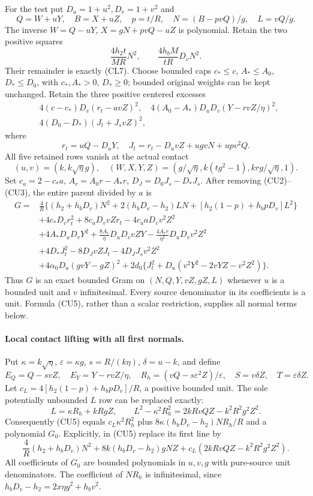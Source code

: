 For the test put $D_u=1+u^2,D_v=1+v^2$ and
\[
 Q=W+uY,\quad B=X+uZ,\quad p=t/R,
 \quad N=(B-pvQ)/g,\quad L=vQ/g.
\]
The inverse $W=Q-uY$, $X=gN+pvQ-uZ$ is polynomial.
Retain the two positive squares
\[
 \frac{4h_2t}{MR}N^2,\qquad
 \frac{4h_bM}{tR}D_vN^2.                            \tag{CU2}
\]
Their remainder is exactly (CL7). Choose bounded caps
$c_*\le c$, $A_*\le A_0$, $D_*\le D_0$, with $c_*,A_*>0$,
$D_*\ge0$; bounded original weights can be kept unchanged.
Retain the three positive centered excesses
\[
\begin{aligned}
 &4(c-c_*)D_v(r_t-avZ)^2,\quad
 4(A_0-A_*)D_uD_v(Y-rvZ/\eta)^2,\\
 &4(D_0-D_*)(J_t+J_svZ)^2,
\end{aligned}                                                     \tag{CU3}
\]
where
\[
 r_t=uQ-D_uY,\quad J_t=r_t-D_uvZ+ugvN+upv^2Q.
\]
All five retained rows vanish at the actual contact
\[
 (u,v)=(k,k\sqrt\eta g),\quad
 (W,X,Y,Z)=(g/\sqrt\eta,k(tg^2-1),krg/\sqrt\eta,1).
                                                               \tag{CU4}
\]
Set $c_a=2-c_*a$, $A_r=A_0r-A_*r$, $D_J=D_0J_s-D_*J_s$.
After removing (CU2)--(CU3), the entire parent divided by $a$ is
\begin{align*}
G={}&\frac4R\{(h_2+h_bD_v)N^2+2(h_bD_v-h_2)LN
              +[h_2(1-p)+h_bpD_v]L^2\}\\
 &+4c_*D_vr_t^2+8c_aD_vvZr_t-4c_aaD_vv^2Z^2\\
 &+4A_*D_uD_vY^2+\frac{8A_r}{\eta}D_uD_vvZY
                   -\frac{4A_rr}{\eta^2}D_uD_vv^2Z^2\\
 &+4D_*J_t^2-8D_JvZJ_t-4D_JJ_sv^2Z^2\\
 &+4\alpha_0D_u(gvY-gZ)^2
       +2d_0\{J_t^2+D_u(v^2Y^2-2vYZ-v^2Z^2)\}.
                                                               \tag{CU5}
\end{align*}
Thus $G$ is an exact bounded Gram on $(N,Q,Y,vZ,gZ,L)$ whenever
$u$ is a bounded unit and $v$ infinitesimal. Every source denominator
in its coefficients is a unit. Formula (CU5), rather than a scalar
restriction, supplies all normal terms below.

\paragraph{Local contact lifting with all first normals.}
Put $\kappa=k\sqrt\eta$, $\varepsilon=\kappa g$,
$s=R/(k\eta)$, $\delta=u-k$, and define
\[
 E_Q=Q-svZ,\quad E_Y=Y-rvZ/\eta,\quad
 R_h=(vQ-s\varepsilon^2Z)/\varepsilon,
 \quad S=v\delta Z,\quad T=\varepsilon\delta Z.
\]
Let $c_L=4[h_2(1-p)+h_bpD_v]/R$, a positive bounded unit.
The sole potentially unbounded $L$ row can be replaced exactly:
\[
 L=\kappa R_h+kR gZ,\qquad
 L^2-\kappa^2R_h^2=2kR vQZ-k^2R^2g^2Z^2.           \tag{CU6}
\]
Consequently (CU5) equals $c_L\kappa^2R_h^2$
plus $8\kappa(h_bD_v-h_2)NR_h/R$ and a polynomial $G_0$.
Explicitly, in (CU5) replace its first line by
\[
 \frac4R(h_2+h_bD_v)N^2+8k(h_bD_v-h_2)gNZ
                 +c_L(2kRvQZ-k^2R^2g^2Z^2).        \tag{CU7}
\]
All coefficients of $G_0$ are bounded polynomials in $u,v,g$ with
pure-source unit denominators. The coefficient of $NR_h$ is
infinitesimal, since $h_bD_v-h_2=2x\eta g^2+h_bv^2$.


